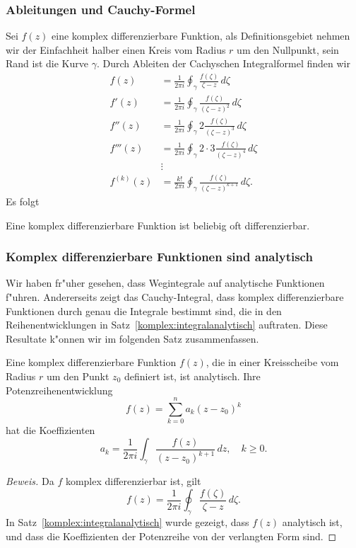 \subsubsection{Ableitungen und Cauchy-Formel}
Sei $f(z)$ eine komplex differenzierbare Funktion, als Definitionsgebiet
nehmen wir der Einfachheit halber einen Kreis vom Radius $r$ um den Nullpunkt,
sein Rand ist die Kurve $\gamma$.
Durch Ableiten der Cachyschen Integralformel finden wir
\begin{align*}
f(z)
&=
\frac1{2\pi i}\oint_{\gamma}\frac{f(\zeta)}{\zeta-z}\,d\zeta
\\
f'(z)
&=
\frac1{2\pi i}\oint_{\gamma}\frac{f(\zeta)}{(\zeta-z)^2}\,d\zeta
\\
f'' (z)
&=
\frac1{2\pi i}\oint_{\gamma}2\frac{f(\zeta)}{(\zeta-z)^3}\,d\zeta
\\
f'''(z)
&=
\frac1{2\pi i}\oint_{\gamma}2\cdot 3\frac{f(\zeta)}{(\zeta-z)^4}\,d\zeta
\\
&\vdots
\\
f^{(k)}(z)
&=
\frac{k!}{2\pi i}\oint_{\gamma}\frac{f(\zeta)}{(\zeta-z)^{k+1}}\,d\zeta.
\end{align*}
Es folgt

\begin{satz}
Eine komplex differenzierbare Funktion ist beliebig oft differenzierbar.
\end{satz}

\subsubsection{Komplex differenzierbare Funktionen sind analytisch}
Wir haben fr"uher gesehen, dass Wegintegrale auf analytische Funktionen
f"uhren.
Andererseits zeigt das Cauchy-Integral, dass komplex differenzierbare
Funktionen durch genau die Integrale bestimmt sind, die in den
Reihenentwicklungen in Satz~\ref{komplex:integralanalytisch} auftraten.
Diese Resultate k"onnen wir im folgenden Satz zusammenfassen.

\begin{satz}
Eine komplex differenzierbare Funktion $f(z)$, die in einer Kreisscheibe
vom Radius $r$ um den Punkt $z_0$ definiert ist, ist analytisch.
Ihre Potenzreihenentwicklung
\[
f(z)=\sum_{k=0}^na_k(z-z_0)^k
\]
hat die Koeffizienten
\[
a_k=\frac1{2\pi i}\int_{\gamma}\frac{f(z)}{(z-z_0)^{k+1}}\,dz,\quad
k\ge 0.
\]
\end{satz}

\begin{proof}[Beweis]
Da $f$ komplex differenzierbar ist, gilt
\[
f(z)=\frac1{2\pi i}\oint_\gamma \frac{f(\zeta)}{\zeta-z}\,d\zeta.
\]
In Satz~\ref{komplex:integralanalytisch} wurde gezeigt, dass $f(z)$
analytisch ist, und dass die Koeffizienten der Potenzreihe von
der verlangten Form sind.
\end{proof}

